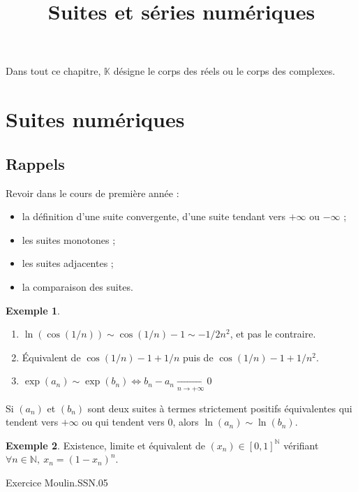 \documentclass[french]{article}
\title{Suites et séries numériques}
\date{}
\newcommand{\N}{\mathbb{N}}
\newcommand{\K}{\mathbb{K}}
\theoremstyle{plain}
\theoremstyle{definition}
\newtheorem*{ex}{Exemple}
\theoremstyle{remark}
\begin{document}
\tableofcontents
\newpage

\maketitle

Dans tout ce chapitre, $\K$ désigne le corps des réels ou le corps des complexes.

\section{Suites numériques}

\subsection{Rappels}

Revoir dans le cours de première année :
\begin{itemize}
	\item la définition d'une suite convergente, d'une suite tendant vers $+\infty$ ou $-\infty$ ;
	\item les suites monotones ;
	\item les suites adjacentes ;
	\item la comparaison des suites.
\end{itemize}

\begin{ex}
	\begin{enumerate}
		\item $\ln(\cos(1/n))\sim\cos(1/n)-1\sim-1/2n^2$, et pas le contraire.
		\item Équivalent de $\cos(1/n)-1+1/n$ puis de $\cos(1/n)-1+1/n^2$.
		\item $\exp(a_n)\sim\exp(b_n)\iff b_n-a_n\xrightarrow[n\to+\infty]{}0$
	\end{enumerate}
\end{ex}

\begin{prop}[HP]%
	Si $(a_n)$ et $(b_n)$ sont deux suites à termes strictement positifs équivalentes qui tendent vers $+\infty$ ou qui tendent vers $0$, alors $\ln(a_n)\sim\ln(b_n)$.
\end{prop}

\begin{ex}
	Existence, limite et équivalent de $(x_n)\in[0,1]^\N$ vérifiant $\forall n\in\N,\ x_n=(1-x_n)^n$.
\end{ex}

Exercice Moulin.SSN.05
\end{document}
